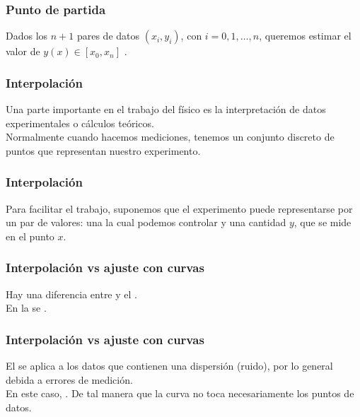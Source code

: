 \documentclass[12pt]{beamer}
\begin{document}
\begin{frame}
\frametitle{Punto de partida}
Dados los $n + 1$ pares de datos $(x_{i}, y_{i})$, con $i = 0, 1 , \ldots, n$, queremos estimar el valor de $y (x) \in [x_{0}, x_{n}]$ .
\end{frame}
\begin{frame}
\frametitle{Interpolación}
Una parte importante en el trabajo del físico es la interpretación de datos experimentales o cálculos teóricos.
\\
\bigskip
\pause
Normalmente cuando hacemos mediciones, tenemos un conjunto discreto de puntos que representan nuestro experimento.
\end{frame}
\begin{frame}
\frametitle{Interpolación}
Para facilitar el trabajo, suponemos que el experimento puede representarse por un par de valores: una  la cual podemos controlar y una cantidad $y$, que se mide en el punto $x$.
\end{frame}
\begin{frame}
\frametitle{Interpolación vs ajuste con curvas}
Hay una diferencia entre  y el .
\\
\bigskip
\pause
En la  \pause se \emph{}.
\end{frame}
\begin{frame}
\frametitle{Interpolación vs ajuste con curvas}
El  se aplica a los datos que contienen una dispersión (ruido), por lo general debida a errores de medición.
\\
\bigskip
\pause
En este caso, . \pause De tal manera que la curva no toca necesariamente los puntos de datos.
\end{frame}
\end{document}
